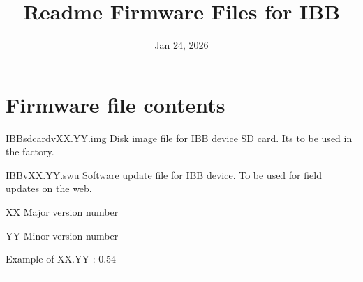 \documentclass[letterpaper,10pt,english]{sphinxhowto}
\title{Readme Firmware Files for IBB}
\date{Jan 24, 2026}
\author{}
\begin{document}
\pagestyle{empty}

\pagestyle{plain}

\pagestyle{normal}
\label{\detokenize{index::doc}}


\sphinxstepscope


\section{Firmware file contents}
\label{\detokenize{topics/readme_fwf:firmware-file-contents}}\label{\detokenize{topics/readme_fwf::doc}}
\sphinxAtStartPar
IBB\sphinxhyphen{}sdcard\sphinxhyphen{}vXX.YY.img \sphinxhyphen{} Disk image file for IBB device SD card. Its to be used in the factory.

\sphinxAtStartPar
IBB\sphinxhyphen{}vXX.YY.swu \sphinxhyphen{} Software update file for IBB device. To be used for field updates on the web.

\sphinxAtStartPar
XX \sphinxhyphen{} Major version number

\sphinxAtStartPar
YY \sphinxhyphen{} Minor version number

\sphinxAtStartPar
Example of XX.YY : 0.54


\bigskip\hrule\bigskip




\renewcommand{\indexname}{Index}
\printindex
\end{document}
